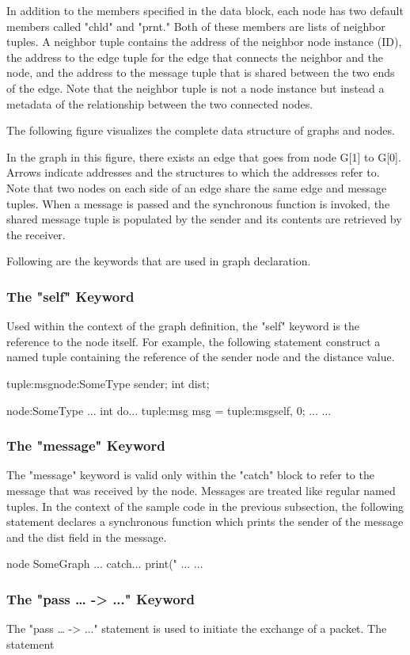 \documentclass{article}
\begin{document}
In addition to the members specified in the data block, each node has two default members called "chld" and "prnt." Both of these members are lists of neighbor tuples. A neighbor tuple contains the address of the neighbor node instance (ID), the address to the edge tuple for the edge that connects the neighbor and the node, and the address to the message tuple that is shared between the two ends of the edge. Note that the neighbor tuple is not a node instance but instead a metadata of the relationship between the two connected nodes.

The following figure visualizes the complete data structure of graphs and nodes. 

In the graph in this figure, there exists an edge that goes from node G[1] to G[0]. Arrows indicate addresses and the structures to which the addresses refer to. Note that two nodes on each side of an edge share the same edge and message tuples. When a message is passed and the synchronous function is invoked, the shared message tuple is populated by the sender and its contents are retrieved by the receiver.

Following are the keywords that are used in graph declaration.
\subsubsection{The "self" Keyword}
Used within the context of the graph definition, the "self" keyword is the reference to the node itself. For example, the following statement construct a named tuple containing the reference of the sender node and the distance value.

tuple:msg{node:SomeType sender; int dist;}

node:SomeType{
	...
	int do{...
tuple:msg msg = tuple:msg{self, 0};
...}
...}
\subsubsection{The "message" Keyword}
The "message" keyword is valid only within the "catch" block to refer to the message that was received by the node. Messages are treated like regular named tuples. In the context of the sample code in the previous subsection, the following statement declares a synchronous function which prints the sender of the message and the dist field in the message.

node SomeGraph{
	...
	catch{...
		print("%
...}
...}
\subsubsection{The "pass … -> ..." Keyword}
The "pass … -> ..." statement is used to initiate the exchange of a packet. The statement
\end{document}
